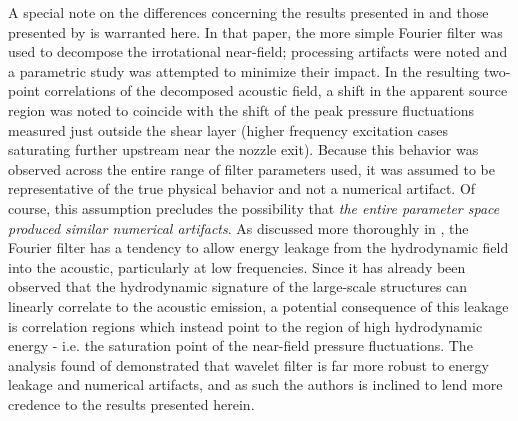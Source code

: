 A special note on the differences concerning the results presented in  and those presented by \citet{Crawley2015} is warranted here.
In that paper, the more simple Fourier filter was used to decompose the irrotational near-field; processing artifacts were noted and a parametric study was attempted to minimize their impact.
In the resulting two-point correlations of the decomposed acoustic field, a shift in the apparent source region was noted to coincide with the shift of the peak pressure fluctuations measured just outside the shear layer (higher frequency excitation cases saturating further upstream near the nozzle exit).
Because this behavior was observed across the entire range of filter parameters used, it was assumed to be representative of the true physical behavior and not a numerical artifact.
Of course, this assumption precludes the possibility that \textit{the entire parameter space produced similar numerical artifacts}. 
As discussed more thoroughly in \citet{Crawley2016}, the Fourier filter has a tendency to allow energy leakage from the hydrodynamic field into the acoustic, particularly at low frequencies. 
Since it has already been observed that the hydrodynamic signature of the large-scale structures can linearly correlate to the acoustic emission, a potential consequence of this leakage is correlation regions which instead point to the region of high hydrodynamic energy - i.e. the saturation point of the near-field pressure fluctuations.
The analysis found of \citet{Crawley2016} demonstrated that wavelet filter is far more robust to energy leakage and numerical artifacts, and as such the authors is inclined to lend more credence to the results presented herein. 